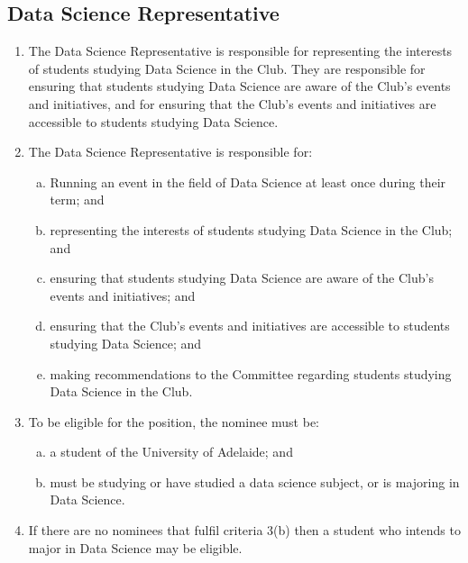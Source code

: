 \documentclass{schedule}
\begin{document}
\subsection{Data Science Representative}
\begin{enumerate}[(1)]
    \item The Data Science Representative is responsible for representing the interests of students studying Data Science in the Club. They are responsible for ensuring that students studying Data Science are aware of the Club's events and initiatives, and for ensuring that the Club's events and initiatives are accessible to students studying Data Science.
    \item The Data Science Representative is responsible for:
          \begin{enumerate}[(a)]
              \item Running an event in the field of Data Science at least once during their term; and
              \item representing the interests of students studying Data Science in the Club; and
              \item ensuring that students studying Data Science are aware of the Club's events and initiatives; and
              \item ensuring that the Club's events and initiatives are accessible to students studying Data Science; and
              \item making recommendations to the Committee regarding students studying Data Science in the Club.
          \end{enumerate}
    \item To be eligible for the position, the nominee must be:
          \begin{enumerate}[(a)]
              \item a student of the University of Adelaide; and
              \item must be studying or have studied a data science subject, or is majoring in Data Science.
          \end{enumerate}
    \item If there are no nominees that fulfil criteria 3(b) then a student who intends to major in Data Science may be eligible.
\end{enumerate}
\end{document}
